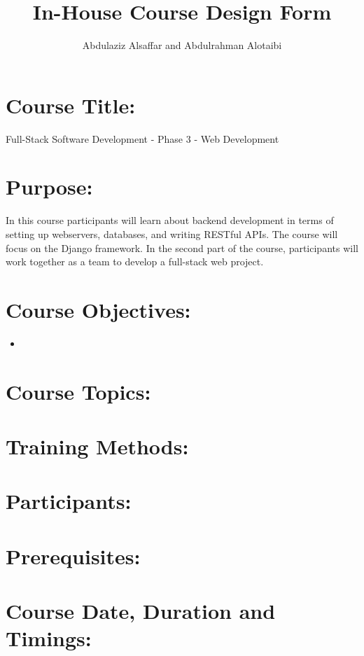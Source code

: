 \documentclass[a4paper,11pt]{article}
\author{Abdulaziz Alsa{f}far and Abdulrahman Alotaibi}
\title{In-House Course Design Form}
\begin{document}
\maketitle
\pagestyle{plain}
\setcounter{page}{1}

\section{Course Title:}
Full-Stack Software Development - Phase 3 - Web Development

\section{Purpose:}
In this course participants will learn about backend development in terms of setting up webservers, databases, and writing RESTful APIs. The course will focus on the Django framework. In the second part of the course, participants will work together as a team to develop a full-stack web project.

\section{Course Objectives:}
\begin{itemize}
	\item 
\end{itemize}

\section{Course Topics:}
\section{Training Methods:}
\section{Participants:}
\section{Prerequisites:}
\section{Course Date, Duration and Timings:}
\end{document}
